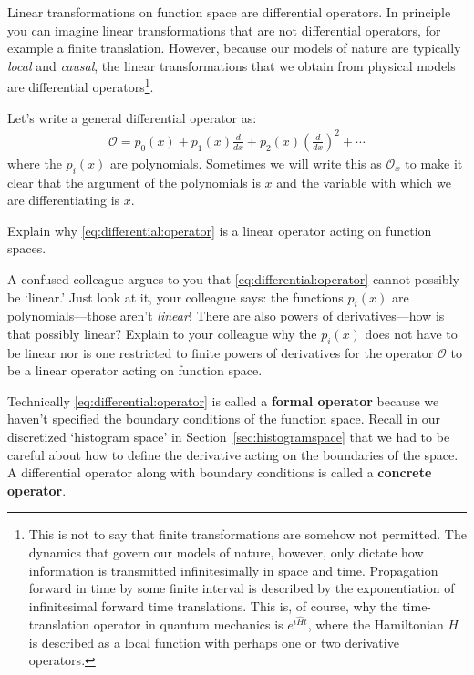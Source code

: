 Linear transformations on function space are differential operators. In principle you can imagine linear transformations that are not differential operators, for example a finite translation. However, because our models of nature are typically \emph{local} and \emph{causal}, the linear transformations that we obtain from physical models are differential operators\footnote{This is not to say that finite transformations are somehow not permitted. The dynamics that govern our models of nature, however, only dictate how information is transmitted infinitesimally in space and time. Propagation forward in time by some finite interval is described by the exponentiation of infinitesimal forward time translations. This is, of course, why the time-translation operator in quantum mechanics is $e^{i\hat H t}$, where the Hamiltonian $H$ is described as a local function with perhaps one or two derivative operators.}. 

Let's write a general differential operator as:
\begin{align}
	\mathcal O = 
	p_0(x) 
	+ p_1(x) \frac{d}{dx}
	+ p_2(x) \left(\frac{d}{dx}\right)^2
	+ \cdots
	\label{eq:differential:operator}
\end{align}
where the $p_i(x)$ are polynomials. Sometimes we will write this as $\mathcal O_x$ to make it clear that the argument of the polynomials is $x$ and the variable with which we are differentiating is $x$.  
\begin{exercise}
Explain why \eqref{eq:differential:operator} is a linear operator acting on function spaces.
\end{exercise}
\begin{exercise}
A confused colleague argues to you that \eqref{eq:differential:operator} cannot possibly be `linear.' Just look at it, your colleague says: the functions $p_i(x)$ are polynomials---those aren't \emph{linear}! There are also powers of derivatives---how is that possibly linear? Explain to your colleague why the $p_i(x)$ does not have to be linear nor is one restricted to finite powers of derivatives for the operator $\mathcal O$ to be a linear operator acting on function space.
\end{exercise}
Technically \eqref{eq:differential:operator} is called a \textbf{formal operator} because we haven't specified the boundary conditions of the function space. Recall in our discretized `histogram space' in Section~\ref{sec:histogramspace} that we had to be careful about how to define the derivative acting on the boundaries of the space. A differential operator along with boundary conditions is called a \textbf{concrete operator}.

